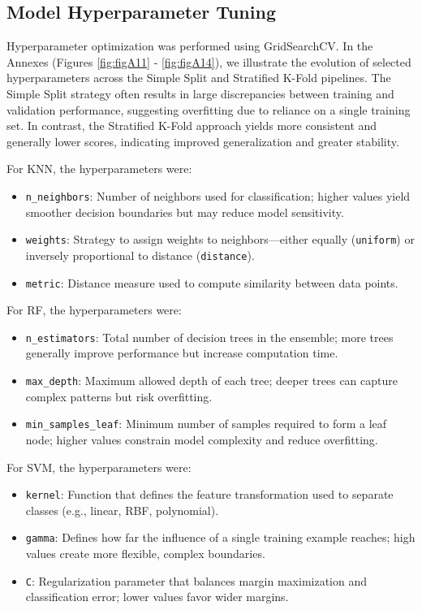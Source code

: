 \subsection{Model Hyperparameter Tuning}

Hyperparameter optimization was performed using GridSearchCV. In the Annexes
(Figures \ref{fig:figA11} - \ref{fig:figA14}), we illustrate the evolution of
selected hyperparameters across the Simple Split and Stratified K-Fold
pipelines. The Simple Split strategy often results in large discrepancies
between training and validation performance, suggesting overfitting due to
reliance on a single training set. In contrast, the Stratified K-Fold approach
yields more consistent and generally lower scores, indicating improved
generalization and greater stability.

For KNN, the hyperparameters were:

\begin{itemize}
	\item \texttt{n\_neighbors}: Number of neighbors used for classification;
	      higher values yield smoother decision boundaries but may reduce model
	      sensitivity.
	\item \texttt{weights}: Strategy to assign weights to neighbors—either
	      equally (\texttt{uniform}) or inversely proportional to distance
	      (\texttt{distance}).
	\item \texttt{metric}: Distance measure used to compute similarity between
	      data points.
\end{itemize}

For RF, the hyperparameters were:

\begin{itemize}
	\item \texttt{n\_estimators}: Total number of decision trees in the ensemble;
	      more trees generally improve performance but increase computation time.
	\item \texttt{max\_depth}: Maximum allowed depth of each tree; deeper trees
	      can capture complex patterns but risk overfitting.
	\item \texttt{min\_samples\_leaf}: Minimum number of samples required to form
	      a leaf node; higher values constrain model complexity and reduce
	      overfitting.
\end{itemize}

For SVM, the hyperparameters were:

\begin{itemize}
	\item \texttt{kernel}: Function that defines the feature transformation used
	      to separate classes (e.g., linear, RBF, polynomial).
	\item \texttt{gamma}: Defines how far the influence of a single training
	      example reaches; high values create more flexible, complex boundaries.
	\item \texttt{C}: Regularization parameter that balances margin maximization
	      and classification error; lower values favor wider margins.
\end{itemize}

